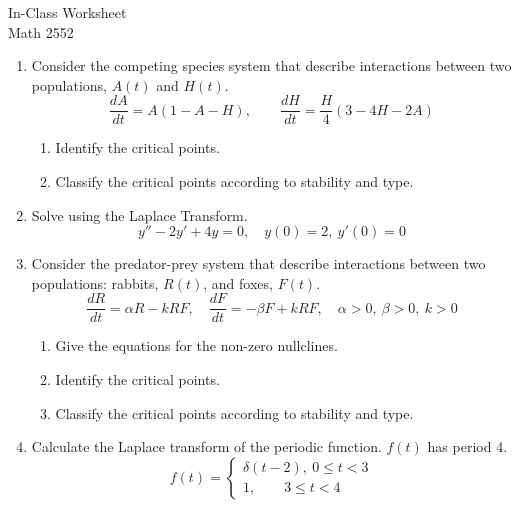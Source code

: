 \documentclass[12pt]{article}
\newcommand{\TestName}{In-Class Worksheet}
\begin{document}
    
\vspace*{-.5cm}


\newcommand{\Course}{Math 2552}

\begin{center}
{\Large \TestName 
\\[4pt]
\Course}
\end{center}



\begin{enumerate}[label=\Alph*)]
    
    \item Consider the competing species system that describe interactions between two populations, $A(t)$ and $H(t)$. 
    $$\frac{dA}{dt} = A(1-A-H), \qquad \frac{dH}{dt} = \frac H4(3-4H-2A)$$
    \begin{enumerate}
        \item Identify the critical points. 
        \item Classify the critical points according to stability and type. 
    \end{enumerate}    
    

    
    \item Solve using the Laplace Transform. %
    $$y'' -2y' + 4y = 0, \quad y(0) = 2, \ y'(0) = 0$$ 
    
    \item Consider the predator-prey system that describe interactions between two populations: rabbits, $R(t)$, and foxes, $F(t)$.
    $$\frac{dR}{dt} = \alpha R - k RF, \quad \frac{dF}{dt} = - \beta F +  k RF, \quad  \alpha > 0 , \ \beta > 0, \ k > 0$$
    \begin{enumerate}
        \item Give the equations for the non-zero nullclines. 
        \item Identify the critical points. 
        \item Classify the critical points according to stability and type. 
    \end{enumerate}
    
    \item Calculate the Laplace transform of the periodic function. $f(t)$ has period 4. 
    $$ f(t) =  \begin{cases}
    \delta(t - 2), \ 0 \le t < 3\\
    1, \qquad 3 \le t < 4
    \end{cases}
    $$
    

\end{enumerate}
\end{document}
